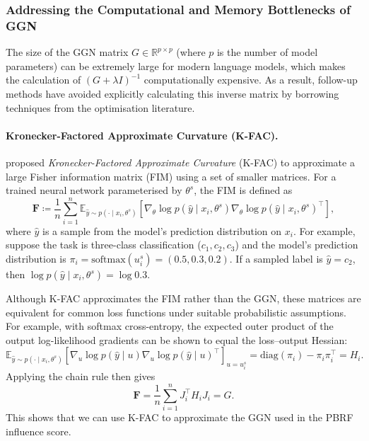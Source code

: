 \subsubsection{Addressing the Computational and Memory Bottlenecks of GGN}

The size of the GGN matrix $G \in \mathbb{R}^{p \times p}$ (where $p$ is the number of model parameters) can be extremely large for modern language models, which makes the calculation of $(G + \lambda I)^{-1}$ computationally expensive. As a result, follow-up methods have avoided explicitly calculating this inverse matrix by borrowing techniques from the optimisation literature.

\paragraph{Kronecker-Factored Approximate Curvature (K-FAC).}
 proposed \emph{Kronecker-Factored Approximate Curvature} (K-FAC) to approximate a large Fisher information matrix (FIM) using a set of smaller matrices. For a trained neural network parameterised by $\theta^s$, the FIM is defined as
\[
\mathbf{F}
\coloneqq
\frac{1}{n}\sum_{i=1}^{n}
\mathbb{E}_{\hat{y} \sim p(\cdot \mid x_i, \theta^s)}
\left[
\nabla_\theta \log p(\hat{y} \mid x_i, \theta^s)
\nabla_\theta \log p(\hat{y} \mid x_i, \theta^s)^\top
\right],
\]
where $\hat{y}$ is a sample from the model's prediction distribution on $x_i$. For example, suppose the task is three-class classification ($c_1, c_2, c_3$) and the model's prediction distribution is $\pi_i=\mathrm{softmax}(u_i^s) = (0.5, 0.3, 0.2)$. If a sampled label is $\hat{y}=c_2$, then $\log p(\hat{y} \mid x_i, \theta^s) = \log 0.3$.

Although K-FAC approximates the FIM rather than the GGN, these matrices are equivalent for common loss functions under suitable probabilistic assumptions. For example, with softmax cross-entropy, the expected outer product of the output log-likelihood gradients can be shown to equal the loss--output Hessian:
\[
\mathbb{E}_{\hat{y} \sim p(\cdot \mid x_i, \theta^s)}
\left[
\nabla_u \log p(\hat{y} \mid u)
\nabla_u \log p(\hat{y} \mid u)^\top
\right]_{u=u_i^s}
=
\mathrm{diag}(\pi_i)-\pi_i\pi_i^\top
=
H_i.
\]
Applying the chain rule then gives
\[
\mathbf{F}
=
\frac{1}{n}\sum_{i=1}^{n}J_i^\top H_i J_i
=
G.
\]
This shows that we can use K-FAC to approximate the GGN used in the PBRF influence score.

